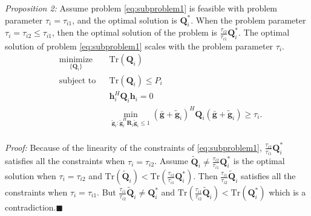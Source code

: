 \documentclass[12pt, journal,onecolumn,draftclsnofoot]{IEEEtran}
\begin{document}
\emph{Proposition 2:} Assume problem \eqref{eq:subproblem1} is feasible with problem parameter $\tau_i = \tau_{i1}$, and the optimal solution is $\mathbf{Q}_i^*$. When the problem parameter $\tau_i = \tau_{i2} \leq \tau_{i1}$, then the optimal solution of the problem is $\frac{\tau_{i2}}{\tau_{i1}}\mathbf{Q}_i^*$. The optimal solution of problem \eqref{eq:subproblem1} scales with the problem parameter $\tau_i$.
\begin{equation}
\begin{aligned} \label{eq:subproblem1}
& \underset{\{\mathbf{Q}_i\}}{\text{minimize}}
& & \mathrm{Tr}(\mathbf{Q}_i) \\
& \text{subject to}
& & \mathrm{Tr}(\mathbf{Q}_i) \leq P_i\\
&&& \mathbf{h}_i^H \mathbf{Q}_i \mathbf{h}_i= 0\\
&&& \min_{\tilde{\mathbf{g}}_i: \tilde{\mathbf{g}}_i^H \mathbf{R}_i\tilde{\mathbf{g}}_i \leq 1}(\bar{\mathbf{g}}+\tilde{\mathbf{g}}_i)^H\mathbf{Q}_i(\bar{\mathbf{g}}+\tilde{\mathbf{g}}_i) \geq  \tau_{i}.\\
\end{aligned}
\end{equation}

\emph{Proof:} Because of the linearity of the constraints of \eqref{eq:subproblem1},  $\frac{\tau_{i2}}{\tau_{i1}}\mathbf{Q}_i^*$ satisfies all the constraints when $\tau_i = \tau_{i2}$. Assume $\tilde{\mathbf{Q}}_i \neq \frac{\tau_{i2}}{\tau_{i1}}\mathbf{Q}_i^*$ is the optimal solution when $\tau_i = \tau_{i2}$ and $\mathrm{Tr}(\tilde{\mathbf{Q}}_i) < \mathrm{Tr}(\frac{\tau_{i2}}{\tau_{i1}}\mathbf{Q}_i^*)$. Then $\frac{\tau_{i1}}{\tau_{i2}}\tilde{\mathbf{Q}}_i$ satisfies all the constraints when $\tau_i = \tau_{i1}$. But $\frac{\tau_{i1}}{\tau_{i2}}\tilde{\mathbf{Q}}_i \neq \mathbf{Q}_i^*$ and $\mathrm{Tr}(\frac{\tau_{i1}}{\tau_{i2}}\tilde{\mathbf{Q}}_i) < \mathrm{Tr}(\mathbf{Q}_i^*)$ which is a contradiction.$\blacksquare$
\end{document}
